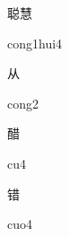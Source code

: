 \begin{multicols*}{2}
\begin{verbete}{聪慧}
\begin{pronuncia}{cong1hui4}
\end{pronuncia}
\end{verbete}

\begin{verbete}[cong2]{从}
\begin{pronuncia}{cong2}
\end{pronuncia}
\end{verbete}

\begin{verbete}[cu4]{醋}
\begin{pronuncia}{cu4}
\end{pronuncia}
\end{verbete}

\begin{verbete}[cuo4]{错}
\begin{pronuncia}{cuo4}
\end{pronuncia}
\end{verbete}

\end{multicols*}
